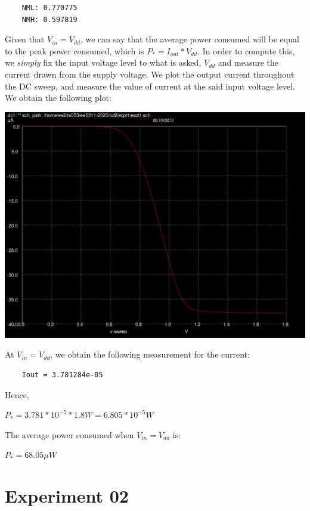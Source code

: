 \documentclass[10pt,a4paper]{article}
\begin{document}
\begin{verbatim}
    NML: 0.770775
    NMH: 0.597819
\end{verbatim}

\noindent Given that $V_{in} = V_{dd}$, we can say that the average power consumed will be equal to the peak power consumed, which is $P_* = I_{out} * V_{dd}$. In order to compute this, we \emph{simply} fix the input voltage level to what is asked, $V_{dd}$ and measure the current drawn from the supply voltage. We plot the output current throughout the DC sweep, and measure the value of current at the said input voltage level. We obtain the following plot:

\begin{center}
\includegraphics[scale=0.3]{tut2/reports/media/expt1_iout.png}
\end{center}

\noindent At $V_{in} = V_{dd}$, we obtain the following measurement for the current:

\begin{verbatim}
    Iout = 3.781284e-05
\end{verbatim}

\noindent Hence,
\begin{center}
    $P_* = 3.781 * 10^{-5} * 1.8 W = 6.805 * 10^{-5} W$
\end{center}
The average power consumed when $V_{in} = V_{dd}$ is:
\begin{center}
    $P_* = 68.05 \mu W$
\end{center}

\section{Experiment 02}
\end{document}
